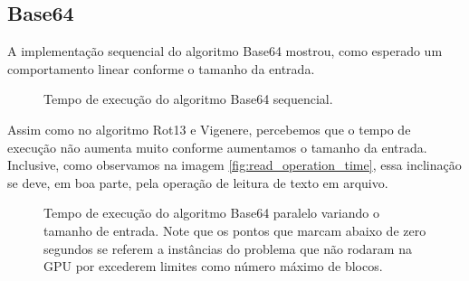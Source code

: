 \documentclass[12pt]{article}
\begin{document}
\subsection{Base64}
A implementação sequencial do algoritmo Base64 mostrou, como esperado
um comportamento linear conforme o tamanho da entrada.

\begin{center}
\begin{figure}[H]
    \caption{Tempo de execução do algoritmo Base64 sequencial.}
    \label{fig:vigenere_seqtime} 
\end{figure}
\end{center}

Assim como no algoritmo Rot13 e Vigenere, percebemos que o tempo
de execução não aumenta muito conforme aumentamos o tamanho da entrada. 
Inclusive, como observamos na imagem \ref{fig:read_operation_time}, 
essa inclinação se deve, em boa parte, pela operação de leitura de texto
em arquivo.

\begin{figure}[H]
    \caption{Tempo de execução do algoritmo Base64 paralelo variando o
    tamanho de entrada. Note que os pontos que marcam abaixo de zero 
    segundos se referem a instâncias do problema que não rodaram na GPU
    por excederem limites como número máximo de blocos.}
\end{figure}
\end{document}
